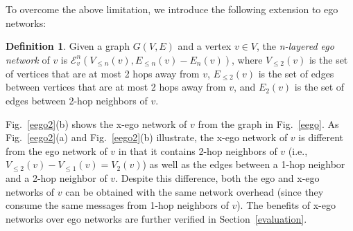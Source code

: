 \documentclass[journal]{IEEEtran}
\newcommand{\V}[2]{V_{#2}({#1})}
\newcommand{\LV}[2]{V_{\le #2}({#1})}
\newcommand{\E}[2]{E_{#2}({#1})}
\newcommand{\LE}[2]{E_{\le #2}({#1})}
\newcommand{\ENN}[2]{\mathcal{E}_{{#1}}^{{#2}}}
\newcommand{\XN}[1]{\mathcal{X}_{{#1}}}
\theoremstyle{definition}
\newtheorem{definition}{Definition}[section]
\begin{document}
To overcome the above limitation, we introduce the following extension to ego networks:

\begin{definition}\label{def:xego-network}
Given a graph $G(V, E)$ and a vertex $v \in V$, the \emph{n-layered ego network} of $v$ is $\ENN{v}{n}(\LV{v}{n}, \LE{v}{n} - \E{v}{n})$, where $\LV{v}{2}$ is the set of vertices that are at most 2 hops away from $v$, $\LE{v}{2}$ is the set of edges between vertices that are at most 2 hops away from $v$, and $\E{v}{2}$ is the set of edges between 2-hop neighbors of $v$.
\end{definition}

% 

Fig.~\ref{eego2}(b) shows the x-ego network of $v$ from the graph in Fig.~\ref{eego}.
As Fig.~\ref{eego2}(a) and Fig.~\ref{eego2}(b) illustrate, the x-ego network of $v$ is different from the ego network of $v$ in that it contains 2-hop neighbors of $v$ (i.e., $\LV{v}{2} - \LV{v}{1} = \V{v}{2}$) as well as the edges between a 1-hop neighbor and a 2-hop neighbor of $v$.
Despite this difference, both the ego and x-ego networks of $v$ can be obtained with the same network overhead (since they consume the same messages from 1-hop neighbors of $v$).
The benefits of x-ego networks over ego networks are further verified in Section~\ref{evaluation}.
\end{document}
